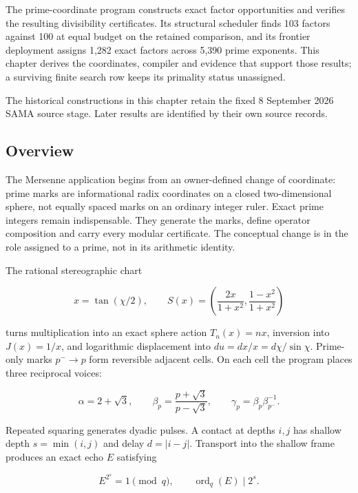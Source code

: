 \label{viii-ch10-prime-coordinates-and-exact-mersenne-factors}

The prime-coordinate program constructs exact factor opportunities and verifies the resulting divisibility certificates. Its structural scheduler finds 103 factors against 100 at equal budget on the retained comparison, and its frontier deployment assigns 1,282 exact factors across 5,390 prime exponents. This chapter derives the coordinates, compiler and evidence that support those results; a surviving finite search row keeps its primality status unassigned.

The historical constructions in this chapter retain the fixed 8 September 2026 SAMA source stage. Later results are identified by their own source records.



\subsection{Overview}\label{viii-ch10-overview}

The Mersenne application begins from an owner-defined change of
coordinate: prime marks are informational radix coordinates on a closed
two-dimensional sphere, not equally spaced marks on an ordinary integer
ruler. Exact prime integers remain indispensable. They generate the
marks, define operator composition and carry every modular certificate.
The conceptual change is in the role assigned to a prime, not in its
arithmetic identity.

The rational stereographic chart

\[
x=\tan(\chi/2),
\qquad
S(x)=\left(\frac{2x}{1+x^2},\frac{1-x^2}{1+x^2}\right)
\]

turns multiplication into an exact sphere action \(T_n(x)=nx\),
inversion into \(J(x)=1/x\), and logarithmic displacement into
\(du=dx/x=d\chi/\sin\chi\). Prime-only marks \(p^-\to p\) form
reversible adjacent cells. On each cell the program places three
reciprocal voices:

\[
\alpha=2+\sqrt3,
\qquad
\beta_p=\frac{p+\sqrt3}{p-\sqrt3},
\qquad
\gamma_p=\beta_p\beta_{p^-}^{-1}.
\]

Repeated squaring generates dyadic pulses. A contact at depths \(i,j\)
has shallow depth \(s=\min(i,j)\) and delay \(d=|i-j|\). Transport into
the shallow frame produces an exact echo \(E\) satisfying

\[
E^{2^s}=1\pmod q,
\qquad
\operatorname{ord}_q(E)\mid2^s.
\]

